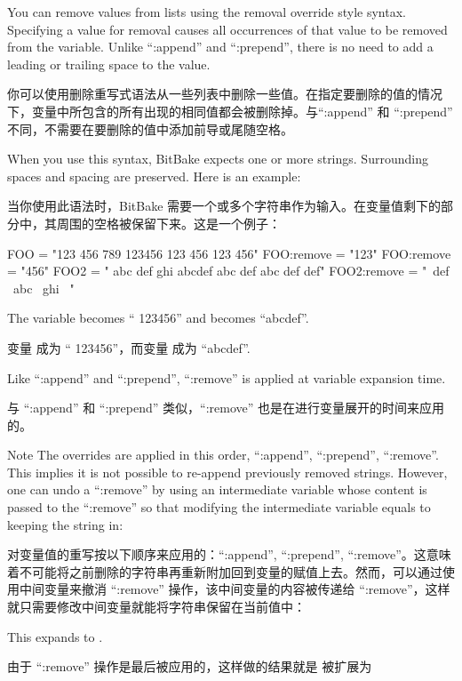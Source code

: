 
You can remove values from lists using the removal override style syntax. Specifying a value for removal causes all occurrences of that value to be removed from the variable. Unlike ``:append'' and ``:prepend'', there is no need to add a leading or trailing space to the value.

你可以使用删除重写式语法从一些列表中删除一些值。在指定要删除的值的情况下，变量中所包含的所有出现的相同值都会被删除掉。与``:append'' 和 ``:prepend'' 不同，不需要在要删除的值中添加前导或尾随空格。

When you use this syntax, BitBake expects one or more strings. Surrounding spaces and spacing are preserved. Here is an example:

当你使用此语法时，BitBake 需要一个或多个字符串作为输入。在变量值剩下的部分中，其周围的空格被保留下来。这是一个例子：

\begin{pyglist}
FOO = "123 456 789 123456 123 456 123 456"
FOO:remove = "123"
FOO:remove = "456"
FOO2 = " abc def ghi abcdef abc def abc def def"
FOO2:remove = "\
    def \
    abc \
    ghi \
    "
\end{pyglist}

The variable  becomes `` 123456\textvisiblespace'' and  becomes ``\textvisiblespace abcdef\textvisiblespace''.

变量 \code{FOO} 成为 `` 123456\textvisiblespace''，而变量  成为 ``\textvisiblespace abcdef\textvisiblespace''.

Like ``:append'' and ``:prepend'', ``:remove'' is applied at variable expansion time.

与 ``:append'' 和 ``:prepend'' 类似，``:remove'' 也是在进行变量展开的时间来应用的。

\begin{noteblock}{Note}%
The overrides are applied in this order, ``:append'', ``:prepend'', ``:remove''. This implies it is not possible to re-append previously removed strings. However, one can undo a ``:remove'' by using an intermediate variable whose content is passed to the ``:remove'' so that modifying the intermediate variable equals to keeping the string in:

\medskip
对变量值的重写按以下顺序来应用的：``:append'', ``:prepend'', ``:remove''。这意味着不可能将之前删除的字符串再重新附加回到变量的赋值上去。然而，可以通过使用中间变量来撤消 ``:remove'' 操作，该中间变量的内容被传递给 ``:remove''，这样就只需要修改中间变量就能将字符串保留在当前值中：

\medskip
{}

\medskip
This expands to .

\medskip
由于 ``:remove'' 操作是最后被应用的，这样做的结果就是  被扩展为 
\end{noteblock}


